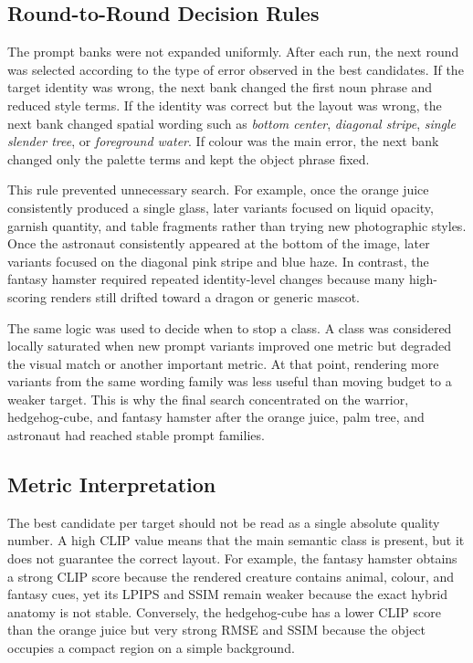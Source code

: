 \documentclass[runningheads]{llncs}
\begin{document}
\subsection{Round-to-Round Decision Rules}

The prompt banks were not expanded uniformly. After each run, the next round was selected according to the type of error observed in the best candidates. If the target identity was wrong, the next bank changed the first noun phrase and reduced style terms. If the identity was correct but the layout was wrong, the next bank changed spatial wording such as \emph{bottom center}, \emph{diagonal stripe}, \emph{single slender tree}, or \emph{foreground water}. If colour was the main error, the next bank changed only the palette terms and kept the object phrase fixed.

This rule prevented unnecessary search. For example, once the orange juice consistently produced a single glass, later variants focused on liquid opacity, garnish quantity, and table fragments rather than trying new photographic styles. Once the astronaut consistently appeared at the bottom of the image, later variants focused on the diagonal pink stripe and blue haze. In contrast, the fantasy hamster required repeated identity-level changes because many high-scoring renders still drifted toward a dragon or generic mascot.

The same logic was used to decide when to stop a class. A class was considered locally saturated when new prompt variants improved one metric but degraded the visual match or another important metric. At that point, rendering more variants from the same wording family was less useful than moving budget to a weaker target. This is why the final search concentrated on the warrior, hedgehog-cube, and fantasy hamster after the orange juice, palm tree, and astronaut had reached stable prompt families.

\subsection{Metric Interpretation}

The best candidate per target should not be read as a single absolute quality number. A high CLIP value means that the main semantic class is present, but it does not guarantee the correct layout. For example, the fantasy hamster obtains a strong CLIP score because the rendered creature contains animal, colour, and fantasy cues, yet its LPIPS and SSIM remain weaker because the exact hybrid anatomy is not stable. Conversely, the hedgehog-cube has a lower CLIP score than the orange juice but very strong RMSE and SSIM because the object occupies a compact region on a simple background.
\end{document}
